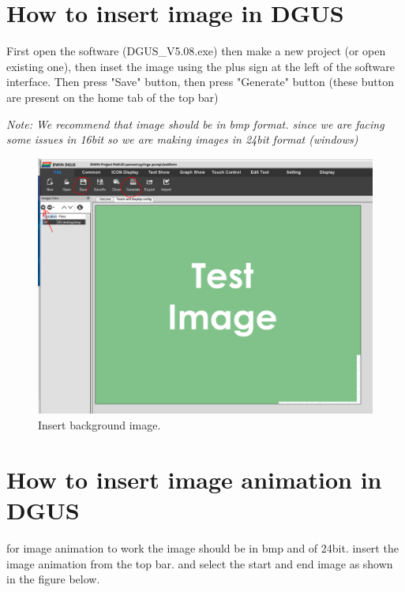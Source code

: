 \documentclass[12pt, A4]{article} %
\begin{document}
\section{How to insert image in DGUS}

First open the software (DGUS\_V5.08.exe) then make a new project (or open existing one), then inset the image using the plus sign at the left of the software interface. Then press "Save" button, then press "Generate" button (these button are present on the home tab of the top bar)

\emph{\textit{Note: We recommend that image should be in bmp format. since we are facing some issues in 16bit so we are making images in 24bit format (windows)}}

\begin{figure}[!htb] %
	\centering
	\includegraphics[width=15cm]{imageInsert} 
	\caption{Insert background image.\\}
\end{figure}

\newpage

\section{How to insert image animation in DGUS}

for image animation to work the image should be in bmp and of 24bit. insert the image animation from the top bar. and select the start and end image as shown in the figure below.
\end{document}
